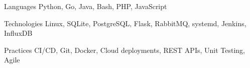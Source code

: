 

\begin{cvskills}

  \cvskill
    {Languages} %
    {Python, Go, Java, Bash, PHP, JavaScript} %

  \cvskill
    {Technologies} %
    {Linux, SQLite, PostgreSQL, Flask, RabbitMQ, systemd, Jenkins, InfluxDB} %
    
  \cvskill
    {Practices}
    {CI/CD, Git, Docker, Cloud deployments, REST APIs, Unit Testing, Agile}


\end{cvskills}
